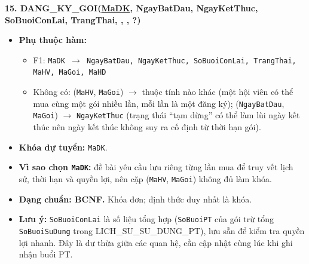 \documentclass[11pt, a4paper]{article}
\newcommand{\pk}[1]{\bgroup\ULdepth=1.8pt\uline{#1}\egroup}
\newcommand{\fk}[1]{\bgroup\ULdepth=1.8pt\dashuline{#1}\egroup}
\begin{document}
\textbf{15. DANG\_KY\_GOI(\pk{MaDK}, NgayBatDau, NgayKetThuc, SoBuoiConLai, TrangThai, \fk{MaHV}, \fk{MaGoi}, \fk{MaHD}?)}
\begin{itemize}
    \item \textbf{Phụ thuộc hàm:}
    \begin{itemize}
        \item F1: \texttt{MaDK $\rightarrow$ NgayBatDau, NgayKetThuc, SoBuoiConLai, TrangThai, MaHV, MaGoi, MaHD}
        \item Không có: (\texttt{MaHV}, \texttt{MaGoi}) $\rightarrow$ thuộc tính nào khác (một hội viên có thể mua cùng một gói nhiều lần, mỗi lần là một đăng ký); (\texttt{NgayBatDau}, \texttt{MaGoi}) $\rightarrow$ \texttt{NgayKetThuc} (trạng thái ``tạm dừng'' có thể làm lùi ngày kết thúc nên ngày kết thúc không suy ra cố định từ thời hạn gói).
    \end{itemize}
    \item \textbf{Khóa dự tuyển:} \texttt{MaDK}.
    \item \textbf{Vì sao chọn \texttt{MaDK}:} đề bài yêu cầu lưu riêng từng lần mua để truy vết lịch sử, thời hạn và quyền lợi, nên cặp (\texttt{MaHV}, \texttt{MaGoi}) không đủ làm khóa.
    \item \textbf{Dạng chuẩn: BCNF.} Khóa đơn; định thức duy nhất là khóa.
    \item \textbf{Lưu ý:} \texttt{SoBuoiConLai} là số liệu tổng hợp (\texttt{SoBuoiPT} của gói trừ tổng \texttt{SoBuoiSuDung} trong LICH\_SU\_SU\_DUNG\_PT), lưu sẵn để kiểm tra quyền lợi nhanh. Đây là dư thừa giữa các quan hệ, cần cập nhật cùng lúc khi ghi nhận buổi PT.
\end{itemize}
\end{document}
